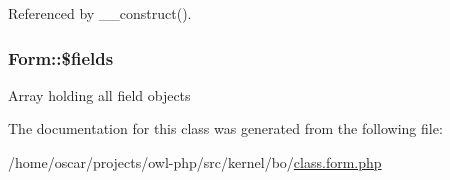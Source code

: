 Referenced by \_\-\_\-construct().

\subsubsection[{\$fields}]{\setlength{\rightskip}{0pt plus 5cm}Form::\$fields}\label{classForm_abcb1c4022c2b93073a00ae65f3269d5b}
Array holding all field objects 

The documentation for this class was generated from the following file:\begin{DoxyCompactItemize}
\item 
/home/oscar/projects/owl-\/php/src/kernel/bo/\hyperlink{class_8form_8php}{class.form.php}\end{DoxyCompactItemize}
